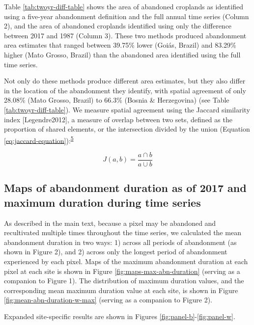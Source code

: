 \documentclass[
]{article}
\begin{document}
Table \ref{tab:twoyr-diff-table} shows the area of abandoned croplands as identified using a five-year abandonment definition and the full annual time series (Column 2), and the area of abandoned croplands identified using only the difference between 2017 and 1987 (Column 3).
These two methods produced abandonment area estimates that ranged between 39.75\% lower (Goiás, Brazil) and 83.29\% higher (Mato Grosso, Brazil) than the abandoned area identified using the full time series.

Not only do these methods produce different area estimates, but they also differ in the location of the abandonment they identify, with spatial agreement of only 28.08\% (Mato Grosso, Brazil) to 66.3\% (Bosnia \& Herzegovina) (see Table \ref{tab:twoyr-diff-table}).
We measure spatial agreement using the Jaccard similarity index {[}Legendre2012{]}, a measure of overlap between two sets, defined as the proportion of shared elements, or the intersection divided by the union (Equation \eqref{eq:jaccard-equation}):\textsuperscript{\protect\hyperlink{ref-Legendre2012}{5}}

\begin{equation}
J(a,b) = \frac{a\cap b}{a\cup b} \label{eq:jaccard-equation}
\end{equation}

\hypertarget{maps-of-abandonment-duration-as-of-2017-and-maximum-duration-during-time-series}{%
\subsection{Maps of abandonment duration as of 2017 and maximum duration during time series}\label{maps-of-abandonment-duration-as-of-2017-and-maximum-duration-during-time-series}}

As described in the main text, because a pixel may be abandoned and recultivated multiple times throughout the time series, we calculated the mean abandonment duration in two ways: 1) across all periods of abandonment (as shown in Figure 2), and 2) across only the longest period of abandonment experienced by each pixel.
Maps of the maximum abandonment duration at each pixel at each site is shown in Figure \ref{fig:maps-max-abn-duration} (serving as a companion to Figure 1).
The distribution of maximum duration values, and the corresponding mean maximum duration value at each site, is shown in Figure \ref{fig:mean-abn-duration-w-max} (serving as a companion to Figure 2).

Expanded site-specific results are shown in Figures \ref{fig:panel-b}-\ref{fig:panel-w}.
\end{document}
